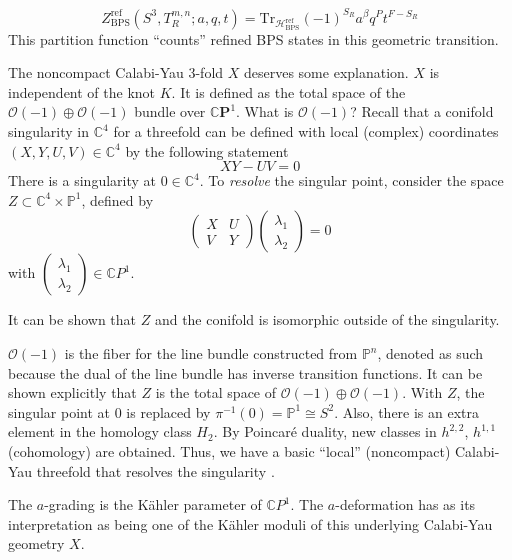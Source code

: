 \documentclass[a4paper,titlepage,twoside]{book}
\begin{document}
\begin{equation}
  Z^{\text{ref}}_{\text{BPS}}{ (S^3, T^{m,n}_R;a,q,t) } = \text{Tr}_{\mathcal{H}^{\text{ref}}_{ \text{BPS}} }{  (-1)^{ S_R} a^{\beta} q^{P} t^{ F- S_R } }
\end{equation}
This partition function ``counts'' refined BPS states in this geometric transition.  

The noncompact Calabi-Yau 3-fold $X$ deserves some explanation.  $X$ is independent of the knot $K$.  It is defined as the total space of the $\mathcal{O}{ (-1) } \oplus \mathcal{O}{ (-1)}$ bundle over $\mathbb{C}\mathbf{P}^1$.  What is $\mathcal{O}{(-1)}$?  Recall that  a conifold singularity in $\mathbb{C}^4$ for a threefold can be defined with local (complex) coordinates $(X,Y,U,V) \in \mathbb{C}^4$ by the following statement
\[
XY - UV =0 
\]
There is a singularity at $0\in \mathbb{C}^4$.  To \emph{resolve} the singular point, consider the space $Z \subset \mathbb{C}^4 \times \mathbb{P}^1$, defined by 
\[
\left( \begin{matrix} X & U \\
  V & Y \end{matrix} \right) \left( \begin{matrix} 
  \lambda_1 \\
  \lambda_2 \end{matrix} \right) = 0
\]
with $\left( \begin{matrix} \lambda_1 \\ \lambda_2 \end{matrix} \right) \in \mathbb{C}P^1$.  

It can be shown that $Z$ and the conifold is isomorphic outside of the singularity.  

$\mathcal{O}{ (-1)}$ is the fiber for the line bundle constructed from $\mathbb{P}^n$, denoted as such because the dual of the line bundle has inverse transition functions.  It can be shown explicitly that $Z$ is the total space of $\mathcal{O}{ (-1)} \oplus \mathcal{O}{ (-1)}$.  With $Z$, the singular point at $0$ is replaced by $\pi^{-1}{ (0)} = \mathbb{P}^1 \cong S^2$.  Also, there is an extra element in the homology class $H_2$.  By Poincar\'{e} duality, new classes in $h^{2,2}$, $h^{1,1}$ (cohomology) are obtained.  Thus, we have a basic ``local'' (noncompact) Calabi-Yau threefold that resolves the singularity \cite{Hori2003}.

The $a$-grading is the K\"{a}hler parameter of $\mathbb{C}P^1$.  The $a$-deformation has as its interpretation as being one of the K\"{a}hler moduli of this underlying Calabi-Yau geometry $X$.
\end{document}
